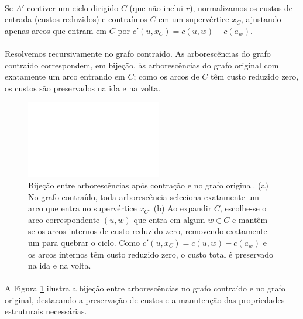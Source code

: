\documentclass[12pt,a4paper]{article}
\def\emph#1{#1}%
\begin{document}
\paragraph{}
Se \(A'\) contiver um ciclo dirigido \(C\) (que não inclui \(r\)), normalizamos os custos de entrada (custos reduzidos) e \emph{contraímos} \(C\) em um supervértice \(x_C\), ajustando apenas arcos que \emph{entram} em \(C\) por \(c'(u,x_C)=c(u,w)-c(a_w)\). 

\paragraph{}
Resolvemos recursivamente no grafo contraído. As arborescências do grafo contraído correspondem, em bijeção, às arborescências do grafo original com exatamente um arco entrando em \(C\); como os arcos de \(C\) têm custo reduzido zero, os custos são preservados na ida e na volta. 


\begin{figure}[H]
    \centering
    \includegraphics[width=0.9\linewidth]{figures/fig_chu_liu_bijection.pdf}

    \caption{Bijeção entre arborescências após contração e no grafo original. (a) No grafo contraído, toda arborescência seleciona exatamente um arco que entra no supervértice $x_C$. (b) Ao expandir $C$, escolhe-se o arco correspondente \((u,w)\) que entra em algum $w\in C$ e mantêm-se os arcos internos de custo reduzido zero, removendo exatamente um para quebrar o ciclo. Como $c'(u,x_C)=c(u,w)-c(a_w)$ e os arcos internos têm custo reduzido zero, o custo total é preservado na ida e na volta.}
    \label{fig:chu-liu-bijection}\end{figure}


\paragraph{}
A Figura \ref{fig:chu-liu-bijection} ilustra a bijeção entre arborescências no grafo contraído e no grafo original, destacando a preservação de custos e a manutenção das propriedades estruturais necessárias.
\end{document}
